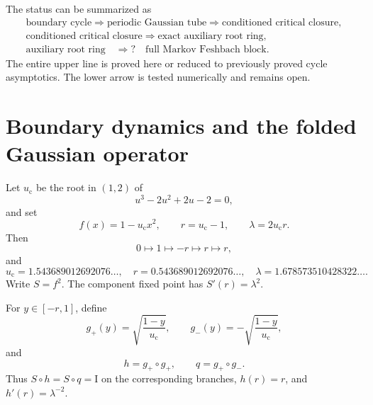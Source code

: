\documentclass[11pt]{article}
\theoremstyle{definition}
\theoremstyle{remark}
\newcommand{\uc}{u_{\mathrm c}}
\newcommand{\Id}{\mathrm I}
\begin{document}
The status can be summarized as
\begin{equation}\label{eq:logical-status}
 \boxed{
 \begin{gathered}
 \text{boundary cycle}
 \Longrightarrow
 \text{periodic Gaussian tube}
 \Longrightarrow
 \text{conditioned critical closure},\\
 \text{conditioned critical closure}
 \Longrightarrow
 \text{exact auxiliary root ring},\\
 \text{auxiliary root ring}
 \quad\Longrightarrow?\quad
 \text{full Markov Feshbach block}.
 \end{gathered}}
\end{equation}
The entire upper line is proved here or reduced to previously proved cycle
asymptotics.  The lower arrow is tested numerically and remains open.

\section{Boundary dynamics and the folded Gaussian operator}
\label{sec:setup}

Let $\uc$ be the root in $(1,2)$ of
\begin{equation}\label{eq:cubic}
 u^3-2u^2+2u-2=0,
\end{equation}
and set
\begin{equation}\label{eq:constants}
 f(x)=1-\uc x^2,
 \qquad r=\uc-1,
 \qquad \lambda=2\uc r.
\end{equation}
Then
\begin{equation}\label{eq:postcritical}
 0\longmapsto1\longmapsto-r\longmapsto r\longmapsto r,
\end{equation}
and
\begin{equation}\label{eq:numerical-constants}
 \uc=1.543689012692076\ldots,
 \quad r=0.543689012692076\ldots,
 \quad \lambda=1.678573510428322\ldots.
\end{equation}
Write $S=f^2$.  The component fixed point has
$S'(r)=\lambda^2$.

For $y\in[-r,1]$, define
\begin{equation}\label{eq:inverse-branches}
 g_+(y)=\sqrt{\frac{1-y}{\uc}},
 \qquad
 g_-(y)=-\sqrt{\frac{1-y}{\uc}},
\end{equation}
and
\begin{equation}\label{eq:hq}
 h=g_+\circ g_+,
 \qquad q=g_+\circ g_-.
\end{equation}
Thus $S\circ h=S\circ q=\Id$ on the corresponding branches,
$h(r)=r$, and $h'(r)=\lambda^{-2}$.
\end{document}
